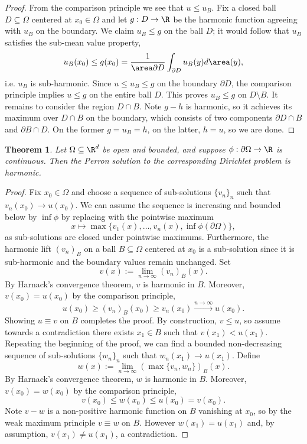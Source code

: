 \documentclass[reqno]{amsart}
\newtheorem{theorem}{Theorem}
\theoremstyle{definition}
\theoremstyle{remark}
\begin{document}
\begin{proof}
	From the comparison principle we see that $u \leq u_B$. Fix a closed ball $D \subseteq \Omega$ centered at $x_0 \in \Omega$ and let $g : D \to \R$ be the harmonic function agreeing with $u_B$ on the boundary. We claim $u_B \leq g$ on the ball $D$; it would follow that $u_B$ satisfies the sub-mean value property,
		\[ u_B(x_0) \leq g(x_0) = \frac{1}{\area \partial D} \int_{\partial D} u_B (y) d \area (y), \]
	i.e. $u_B$ is sub-harmonic. Since $u \leq u_B \leq g$ on the boundary $\partial D$, the comparison principle implies $u \leq g$ on the entire ball $D$. This proves $u_B \leq g$ on $D \setminus B$. It remains to consider the region $D \cap B$. Note $g - h$ is harmonic, so it achieves its maximum over $D \cap B$ on the boundary, which consists of two components $\partial D \cap B$ and $\partial B \cap D$. On the former $g = u_B = h$, on the latter, $h = u$, so we are done. 
\end{proof}

\begin{theorem}
	Let $\Omega \subseteq \R^d$ be open and bounded, and suppose $\phi : \partial \Omega \to \R$ is continuous. Then the Perron solution to the corresponding Dirichlet problem is harmonic. 
\end{theorem}

\begin{proof}
	Fix $x_0 \in \Omega$ and choose a sequence of sub-solutions $\{ v_n \}_n$ such that $v_n (x_0) \to u(x_0)$. We can assume the sequence is increasing and bounded below by $\inf \phi$ by replacing with the pointwise maximum	 
		\[ x \mapsto \max \{ v_1(x), \dots, v_n (x), \inf \phi (\partial \Omega) \}, \]
	as sub-solutions are closed under pointwise maximums. Furthermore, the harmonic lift $(v_n)_B$ on a ball $B \subseteq \Omega$ centered at $x_0$ is a sub-solution since it is sub-harmonic and the boundary values remain unchanged. Set
		\[ v(x) := \lim_{n \to \infty} (v_n)_B (x). \]
	By Harnack's convergence theorem, $v$ is harmonic in $B$. Moreover, $v(x_0) = u(x_0)$ by the comparison principle,
		\[ u(x_0) \geq (v_n)_B (x_0) \geq v_n (x_0) \overset{n \to \infty}{\longrightarrow} u(x_0). \]
	Showing $u \equiv v$ on $B$ completes the proof. By construction, $v \leq u$, so assume towards a contradiction there exists $x_1 \in B$ such that $v(x_1) < u(x_1)$. Repeating the beginning of the proof, we can find a bounded non-decreasing sequence of sub-solutions $\{ w_n \}_n$ such that $w_n (x_1) \to u(x_1)$. Define
		\[ w(x) := \lim_{n \to \infty} (\max \{ v_n, w_n \})_B (x). \]
	By Harnack's convergence theorem, $w$ is harmonic in $B$. Moreover, $v(x_0) = w(x_0)$ by the comparison principle, 
		\[ v(x_0) \leq w(x_0) \leq u(x_0) = v(x_0). \]
	Note $v - w$ is a non-positive harmonic function on $B$ vanishing at $x_0$, so by the weak maximum principle $v \equiv w$ on $B$. However $w(x_1) = u(x_1)$ and, by assumption, $v(x_1) \neq u(x_1)$, a contradiction. 		
\end{proof}
\end{document}
